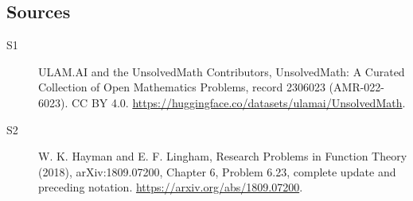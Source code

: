 \documentclass[11pt]{article}
\begin{document}
\subsection{Sources}
\begin{description}
\item[\hypertarget{source:2306023:1}{S1}] ULAM.AI and the UnsolvedMath Contributors, UnsolvedMath: A Curated Collection of Open Mathematics Problems, record 2306023 (AMR-022-6023). CC BY 4.0. \url{https://huggingface.co/datasets/ulamai/UnsolvedMath}.
\item[\hypertarget{source:2306023:2}{S2}] W. K. Hayman and E. F. Lingham, Research Problems in Function Theory (2018), arXiv:1809.07200, Chapter 6, Problem 6.23, complete update and preceding notation. \url{https://arxiv.org/abs/1809.07200}.
\end{description}
\label{end:2306023}
\end{document}
